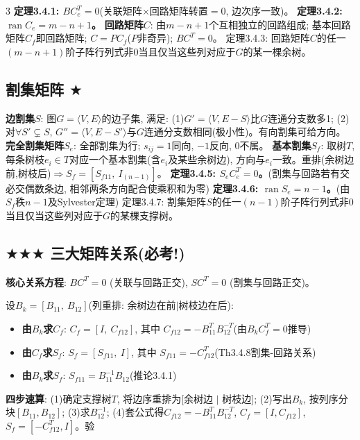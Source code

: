 \documentclass[4.5pt,landscape]{extarticle}
\newcommand{\rd}[1]{\textcolor{rd}{\textbf{#1}}}
\newcommand{\xt}[1]{\textbf{#1}}
\begin{document}
\begin{multicols*}{3}
\rd{定理3.4.1: $BC_e^T=0$}(关联矩阵$\times$回路矩阵转置$=0$, 边次序一致)。
\rd{定理3.4.2: $\operatorname{ran}C_e=m-n+1$。}
\xt{回路矩阵$C$}: 由$m-n+1$个互相独立的回路组成; 基本回路矩阵$C_f$即回路矩阵; $C=PC_f$($P$非奇异); $BC^T=0$。
定理3.4.3: 回路矩阵$C$的任一$(m-n+1)$阶子阵行列式非0当且仅当这些列对应于$G$的某一棵余树。

\subsection{割集矩阵 $\bigstar$}
\xt{边割集$S$}: 图$G=\langle V,E\rangle$的边子集, 满足: (1)$G'=\langle V,E-S\rangle$比$G$连通分支数多1; (2)对$\forall S'\subsetneq S$, $G''=\langle V,E-S'\rangle$与$G$连通分支数相同(极小性)。有向割集可给方向。
\xt{完全割集矩阵$S_e$}: 全部割集为行; $s_{ij}=1$同向, $-1$反向, $0$不属。
\xt{基本割集$S_f$}: 取树$T$, 每条树枝$e_i\in T$对应一个基本割集(含$e_i$及某些余树边), 方向与$e_i$一致。重排(余树边前,树枝后)$\Rightarrow S_f=[S_{f11},\ I_{(n-1)}]$。
\rd{定理3.4.5: $S_eC_e^T=0$。}(割集与回路若有交必交偶数条边, 相邻两条方向配合使乘积和为零)
\rd{定理3.4.6: $\operatorname{ran}S_e=n-1$。}(由$S_f$秩$n-1$及Sylvester定理)
定理3.4.7: 割集矩阵$S$的任一$(n-1)$阶子阵行列式非0当且仅当这些列对应于$G$的某棵支撑树。

\subsection{$\bigstar\bigstar\bigstar$ 三大矩阵关系(必考!)}
\xt{核心关系方程}: $BC^T=0$ (关联与回路正交), $SC^T=0$ (割集与回路正交)。

设$B_k=[B_{11},\ B_{12}]$(列重排: 余树边在前$|$树枝边在后):
\begin{itemize}
\item \rd{由$B_k$求$C_f$}: $C_f=[I,\ C_{f12}]$, 其中 \rd{$C_{f12}=-B_{11}^T B_{12}^{-T}$}(由$B_kC_f^T=0$推导)
\item \rd{由$C_f$求$S_f$}: $S_f=[S_{f11},\ I]$, 其中 \rd{$S_{f11}=-C_{f12}^T$}(Th3.4.8割集-回路关系)
\item \rd{由$B_k$求$S_f$}: \rd{$S_{f11}=B_{11}^{-1}B_{12}$}(推论3.4.1)
\end{itemize}
\xt{四步速算}: (1)确定支撑树$T$, 将边序重排为[余树边 $|$ 树枝边]; (2)写出$B_k$, 按列序分块$[B_{11},B_{12}]$; (3)求$B_{12}^{-1}$; (4)套公式得$C_{f12}=-B_{11}^TB_{12}^{-T}$, $C_f=[I,C_{f12}]$, $S_f=[-C_{f12}^T,I]$。验


\end{multicols*}
\end{document}
